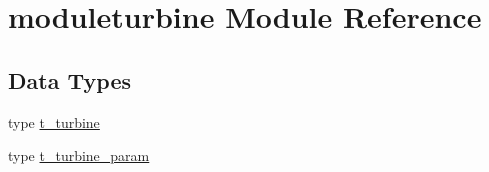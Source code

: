 \hypertarget{namespacemoduleturbine}{}\section{moduleturbine Module Reference}
\label{namespacemoduleturbine}
\subsection*{Data Types}
\begin{DoxyCompactItemize}
\item 
type \mbox{\hyperlink{structmoduleturbine_1_1t__turbine}{t\+\_\+turbine}}
\item 
type \mbox{\hyperlink{structmoduleturbine_1_1t__turbine__param}{t\+\_\+turbine\+\_\+param}}
\end{DoxyCompactItemize}
